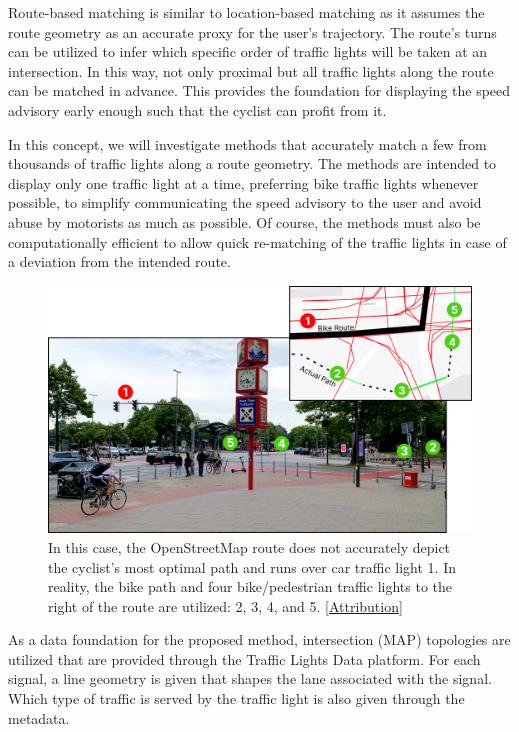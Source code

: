 Route-based matching is similar to location-based matching as it assumes the route geometry as an accurate proxy for the user's trajectory. The route's turns can be utilized to infer which specific order of traffic lights will be taken at an intersection. In this way, not only proximal but all traffic lights along the route can be matched in advance. This provides the foundation for displaying the speed advisory early enough such that the cyclist can profit from it. 

In this concept, we will investigate methods that accurately match a few from thousands of traffic lights along a route geometry. The methods are intended to display only one traffic light at a time, preferring bike traffic lights whenever possible, to simplify communicating the speed advisory to the user and avoid abuse by motorists as much as possible. Of course, the methods must also be computationally efficient to allow quick re-matching of the traffic lights in case of a deviation from the intended route.

\begin{figure}[t]
\centering
\includegraphics[width=\linewidth]{images/sg-selection-example.png}
\caption{In this case, the OpenStreetMap route does not accurately depict the cyclist's most optimal path and runs over car traffic light 1. In reality, the bike path and four bike/pedestrian traffic lights to the right of the route are utilized: 2, 3, 4, and 5. [\hyperref[attribution]{Attribution}]}
\label{fig:sg-selection-example}
\end{figure}

As a data foundation for the proposed method, intersection (MAP) topologies are utilized that are provided through the Traffic Lights Data platform. For each signal, a line geometry is given that shapes the lane associated with the signal. Which type of traffic is served by the traffic light is also given through the metadata.

